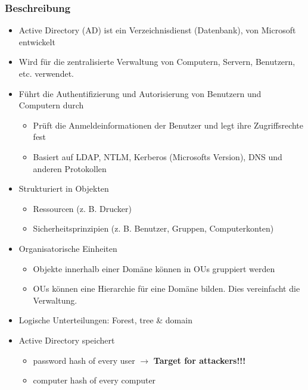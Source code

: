 \subsubsection{Beschreibung}
\begin{itemize}
    \item Active Directory (AD) ist ein Verzeichnisdienst (Datenbank), von Microsoft entwickelt
    \item Wird für die zentralisierte Verwaltung von Computern, Servern, Benutzern, etc. verwendet.
    \item Führt die Authentifizierung und Autorisierung von Benutzern und Computern durch
    \begin{itemize}
        \item Prüft die Anmeldeinformationen der Benutzer und legt ihre Zugriffsrechte fest
        \item Basiert auf LDAP, NTLM, Kerberos (Microsofts Version), DNS und anderen Protokollen
    \end{itemize}
    \item Strukturiert in Objekten
    \begin{itemize}
        \item Ressourcen (z. B. Drucker)
        \item Sicherheitsprinzipien (z. B. Benutzer, Gruppen, Computerkonten)
    \end{itemize}
    \item Organisatorische Einheiten
    \begin{itemize}
        \item Objekte innerhalb einer Domäne können in OUs gruppiert werden
        \item OUs können eine Hierarchie für eine Domäne bilden. Dies vereinfacht die Verwaltung.
    \end{itemize}
    \item Logische Unterteilungen: Forest, tree \& domain
    \item Active Directory speichert
    \begin{itemize}
        \item password hash of every user $\rightarrow$ \textbf{Target for attackers!!!}
        \item computer hash of every computer
    \end{itemize}
\end{itemize}

